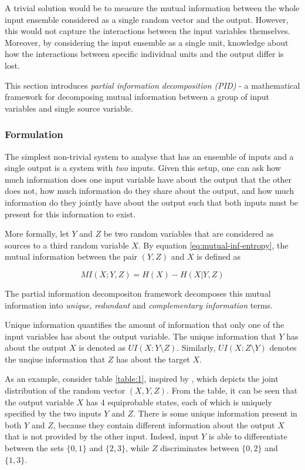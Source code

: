 \documentclass[12pt]{article}
\begin{document}
A trivial solution would be to measure the mutual information between the whole input ensemble considered as a single random vector and the output. However, this would not capture the interactions between the input variables themselves. Moreover, by considering the input ensemble as a single unit, knowledge about how the interactions between specific individual units and the output differ is lost. 

This section introduces \textit{partial information decomposition (PID)} - a mathematical framework for decomposing mutual information between a group of input variables and single source variable.   

\subsubsection{Formulation}

The simplest non-trivial system to analyse that has an ensemble of inputs and a single output is a system with \textit{two} inputs. Given this setup, one can ask how much information does one input variable have about the output that the other does not, how much information do they share about the output, and how much information do they jointly have about the output such that both inputs must be present for this information to exist.

More formally, let $Y$ and $Z$ be two random variables that are considered as sources to a third random variable $X$. By equation \ref{eq:mutual-inf-entropy}, the mutual information between the pair $(Y,Z)$ and $X$ is defined as 

$$MI(X;Y,Z) = H(X) - H(X|Y,Z)$$

The partial information decompositon framework decomposes this mutual information into \textit{unique}, \textit{redundant} and \textit{complementary information} terms. 

Unique information quantifies the amount of information that only one of the input variables has about the output variable. The unique information that $Y$ has about the output $X$ is denoted as $UI(X:Y \setminus Z)$. Similarly, $UI(X:Z \setminus Y)$ denotes the unqiue information that $Z$ has about the target $X$.

As an example, consider table \ref{table:1}, inspired by \cite{pid-synergy}, which depicts the joint distribution of the random vector $(X,Y,Z)$. From the table, it can be seen that the output variable $X$ has 4 equiprobable states, each of which is uniquely specified by the two inputs $Y$ and $Z$. There is some unique information present in both $Y$ and $Z$, because they contain different information about the output $X$ that is not provided by the other input. Indeed, input $Y$ is able to differentiate between the sets $\{0,1\}$ and $\{2,3\}$, while $Z$ discriminates between $\{0, 2\}$ and $\{1,3\}$.
\end{document}
